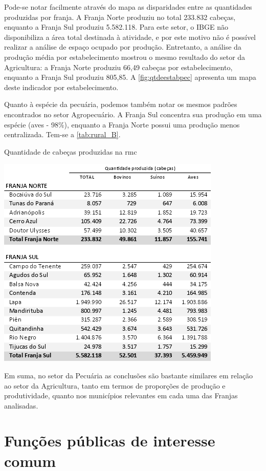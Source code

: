 	Pode-se notar facilmente através do mapa as disparidades entre as quantidades produzidas por franja. A Franja Norte produziu no total 233.832 cabeças, enquanto a Franja Sul produziu 5.582.118. Para este setor, o IBGE não disponibiliza a área total destinada à atividade, e por este motivo não é possível realizar a análise de espaço ocupado por produção. Entretanto, a análise da produção média por estabelecimento mostrou o mesmo resultado do setor da Agricultura: a Franja Norte produziu 66,49 cabeças por estabelecimento, enquanto a Franja Sul produziu 805,85. A \autoref{fig:qtdeestabpec} apresenta um mapa deste indicador por estabelecimento.
	
	Quanto à espécie da pecuária, podemos também notar os mesmos padrões encontrados no setor Agropecuário. A Franja Sul concentra sua produção em uma espécie (aves - 98\%), enquanto a Franja Norte possui uma produção menos centralizada. Tem-se a \autoref{tab:rural_B}.

	\begin{table}[h]
		\centering
		\caption{Quantidade de cabeças produzidas na \gls{rmc}}
		\includegraphics{img/rural_B}
		\label{tab:rural_B}
	\end{table}

	Em suma, no setor da Pecuária as conclusões são bastante similares em relação ao setor da Agricultura, tanto em termos de proporções de produção e produtividade, quanto nos municípios relevantes em cada uma das Franjas analisadas.

	\section{Funções públicas de interesse comum}
	

